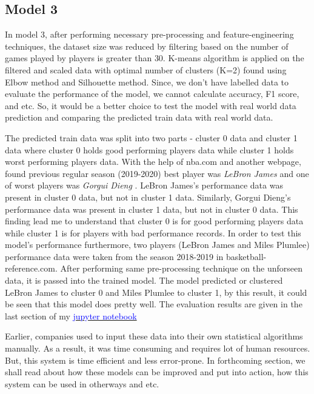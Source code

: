 \documentclass[format=sigconf]{acmart}
\begin{document}
\subsection{Model 3}
In model 3, after performing necessary pre-processing and feature-engineering techniques, the dataset size was reduced by filtering 
based on the number of games played by players is greater than 30. K-means algorithm is applied on the filtered and scaled data with
optimal number of clusters (K=2) found using Elbow method and Silhouette method. Since, we don't have labelled data to evaluate the 
performance of the model, we cannot calculate accuracy, F1 score, and etc. So, it would be a better choice to test the model with
real world data prediction and comparing the predicted train data with real world data. 

The predicted train data was split into two parts - cluster 0 data and cluster 1 data where cluster 0 holds good performing players
data while cluster 1 holds worst performing players data. With the help of nba.com and another webpage, found previous regular 
season (2019-2020) best player was \textit{LeBron James} \cite{bestplayer} and one of worst players was \textit{Gorgui Dieng} \cite{worstplayer}.
LeBron James's performance data was present in cluster 0 data, but not in cluster 1 data. Similarly, Gorgui Dieng's performance
data was present in cluster 1 data, but not in cluster 0 data. This finding lead me to understand that cluster 0 is for good 
performing players data while cluster 1 is for players with bad performance records. In order to test this model's performance
furthermore, two players (LeBron James and Miles Plumlee) performance data were taken from the season 2018-2019 in basketball-reference.com.
After performing same pre-processing technique on the unforseen data, it is passed into the trained model. The model predicted or 
clustered LeBron James \cite{bestplayer2} to cluster 0 and Miles Plumlee \cite{worstplayer2} to cluster 1, by this result, 
it could be seen that this model does pretty well. The evaluation results are given in the last section of my \href{\detokenize{https://nbviewer.jupyter.org/github/lawrence2269/Sports-Analytics
/blob/main/NBA_Draft_Picking_System.ipynb}}{\textcolor{blue}{jupyter notebook}}

Earlier, companies used to input these data into their own statistical algorithms manually. As a result, it was time consuming and 
requires lot of human resources. But, this system is time efficient and less error-prone. In forthcoming section, we shall read 
about how these models can be improved and put into action, how this system can be used in otherways and etc. 
\end{document}
